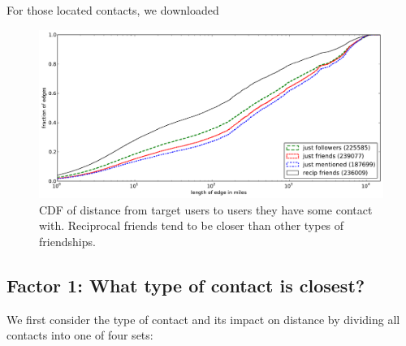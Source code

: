 \documentclass[letterpaper]{article}
\begin{document}
%
For those located contacts, we downloaded



\begin{figure}[tb]
\centering
\includegraphics[width=.9\linewidth]{figures/edge_types_cuml.pdf}
\caption{
CDF of distance from target users to users they have some contact
with.
%
Reciprocal friends tend to be closer than other types of friendships.
}
\label{fig:EdgeTypesCuml}
\vspace{-2pt}
\end{figure}





\subsection{Factor 1: What type of contact is closest?}
\label{sec:EdgeTypes}
We first consider the type of contact and its impact on distance by dividing all contacts into one of four sets:
\end{document}
